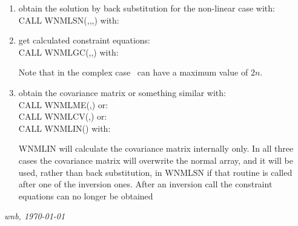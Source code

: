 \begin{enumerate}
\item obtain the solution by back substitution for the non-linear case with:\\
	CALL WNMLSN(\LSQ,\Sol,\Error,\Mean) with:

\item get calculated constraint equations: \\
	CALL WNMLGC(\LSQ,\Nconst,\Constraint) with:
Note that in the complex case \Nconst\ can have a maximum value of $2n$.

\item obtain the covariance matrix or something similar with:\\
	CALL WNMLME(\LSQ,\Xsd) or:\\
	CALL WNMLCV(\LSQ,\Covar) or:\\
	CALL WNMLIN(\LSQ) with:
	WNMLIN will calculate the covariance matrix internally only. In all
three cases the covariance matrix will overwrite the normal array, and it
will be used, rather than back substitution, in WNMLSN if that routine is
called after one of the inversion ones. After an inversion call the
constraint
equations can no longer be obtained

\end{enumerate}

\vspace{2cm}
{\em wnb, \today}
